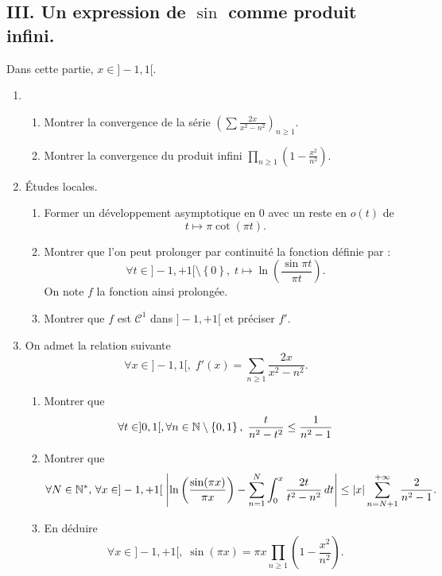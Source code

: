 \subsection*{III. Un expression de $\sin$ comme produit infini.}
Dans cette partie, $x\in ] -1 , 1[$.
\begin{enumerate}
 \item 
 \begin{enumerate}
  \item Montrer la convergence de la série $(\sum \frac{2x}{x^2 - n^2})_{n\geq 1}$.
  \item Montrer la convergence du produit infini $\prod_{n\geq 1}(1-\frac{x^2}{n^2})$.
 \end{enumerate}

 \item \'Etudes locales.
 \begin{enumerate}
  \item Former un développement asymptotique en $0$ avec un reste en $o(t)$ de 
 \[
  t \mapsto \pi \cot (\pi t).
 \]
  \item Montrer que l'on peut prolonger par continuité la fonction définie par : 
  \[
 \forall t \in ]-1,+1[\setminus\left\lbrace 0\right\rbrace,\;  t \mapsto \ln\left( \frac{\sin \pi t}{\pi t}\right).
  \]
On note $f$ la fonction ainsi prolongée.
  \item Montrer que $f$ est $\mathcal{C}^1$ dans $]-1,+1[$ et préciser $f'$.
 \end{enumerate}

   \item On admet la relation suivante
\[
 \forall x \in ]-1,1[,\; f'(x) = \sum_{n\geq 1} \frac{2x}{x^2 - n^2}. 
\]
\begin{enumerate}
 \item Montrer que 
 \[
  \forall t\in ]0,1[, \forall n\in \mathbb{N}\setminus\left\lbrace 0,1\right\rbrace,  \; \frac{t}{n^2 - t^2} \leq \frac{1}{n^2 - 1}
 \]
  \item Montrer que
\[
\forall N\in \mathbb{N}^*, \, \forall x \in ]-1, +1[\;
 \left|\ln\left( \frac{\sin(\pi x)}{\pi x}\right) - \sum_{n=1}^{N}\int_{0}^{x}\frac{2t}{t^2 - n^2}\, dt\right|
 \leq |x| \sum_{n = N+1}^{+\infty}\frac{2}{n^2 -1}.
\]

 \item En déduire 
\[
 \forall x\in ]-1 , +1 [, \; \sin(\pi x) = \pi x \prod_{n \geq 1}\left( 1 - \frac{x^2}{n^2}\right) .
\]

\end{enumerate}

\end{enumerate}

